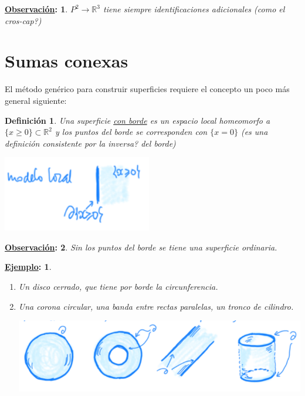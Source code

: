 \documentclass[10pt,a4paper,openright]{book}
\theoremstyle{break}
\newtheorem*{defi}{Definición}
\newtheorem*{obs}{\underline{Observación}:}
\newtheorem*{ej}{\underline{Ejemplo}:}
\begin{document}
\begin{obs}
$P^2 \rightarrow \mathbb{R}^{3}$ tiene siempre identificaciones adicionales (como el cros-cap?)
\end{obs}

\section{Sumas conexas}%
\label{sec:sumas_conexas}
El método genérico para construir superficies requiere el concepto un poco más general siguiente:
\begin{defi}
Una superficie \underline{con borde} es un espacio local homeomorfo a $\{x \ge 0\} \subset \mathbb{R}^{2}$ y los puntos del borde se corresponden con $\{x = 0\}$ (es una definición consistente por la inversa? del borde)
\begin{center}
    \includegraphics[scale=0.3]{images/def_con_borde} 
\end{center}
\end{defi}
\begin{obs}
Sin los puntos del borde se tiene una superficie ordinaria.
\end{obs}

\begin{ej}
\begin{enumerate}
    \item Un disco cerrado, que tiene por borde la circunferencia.
    \item Una corona circular, una banda entre rectas paralelas, un tronco de cilindro. 
    \begin{center}
        \includegraphics[scale=0.3]{images/ej_con_borde} 
    \end{center}
\end{enumerate}
\end{ej}
\end{document}
